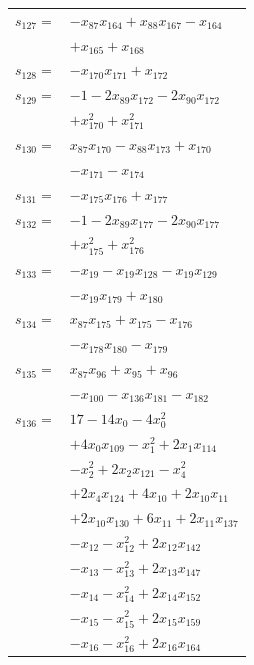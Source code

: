 \begin{longtable}{@{}r@{\;}l@{}}
\(s_{127}=\) & \(\displaystyle -x_{87}x_{164} +x_{88}x_{167} -x_{164}\) \\
 & \(\displaystyle +x_{165} +x_{168}\) \\[3pt]
\(s_{128}=\) & \(\displaystyle -x_{170}x_{171} +x_{172}\) \\[3pt]
\(s_{129}=\) & \(\displaystyle -1 -2x_{89}x_{172} -2x_{90}x_{172}\) \\
 & \(\displaystyle +x_{170}^{2} +x_{171}^{2}\) \\[3pt]
\(s_{130}=\) & \(\displaystyle x_{87}x_{170} -x_{88}x_{173} +x_{170}\) \\
 & \(\displaystyle -x_{171} -x_{174}\) \\[3pt]
\(s_{131}=\) & \(\displaystyle -x_{175}x_{176} +x_{177}\) \\[3pt]
\(s_{132}=\) & \(\displaystyle -1 -2x_{89}x_{177} -2x_{90}x_{177}\) \\
 & \(\displaystyle +x_{175}^{2} +x_{176}^{2}\) \\[3pt]
\(s_{133}=\) & \(\displaystyle -x_{19} -x_{19}x_{128} -x_{19}x_{129}\) \\
 & \(\displaystyle -x_{19}x_{179} +x_{180}\) \\[3pt]
\(s_{134}=\) & \(\displaystyle x_{87}x_{175} +x_{175} -x_{176}\) \\
 & \(\displaystyle -x_{178}x_{180} -x_{179}\) \\[3pt]
\(s_{135}=\) & \(\displaystyle x_{87}x_{96} +x_{95} +x_{96}\) \\
 & \(\displaystyle -x_{100} -x_{136}x_{181} -x_{182}\) \\[3pt]
\(s_{136}=\) & \(\displaystyle 17 -14x_{0} -4x_{0}^{2}\) \\
 & \(\displaystyle +4x_{0}x_{109} -x_{1}^{2} +2x_{1}x_{114}\) \\
 & \(\displaystyle -x_{2}^{2} +2x_{2}x_{121} -x_{4}^{2}\) \\
 & \(\displaystyle +2x_{4}x_{124} +4x_{10} +2x_{10}x_{11}\) \\
 & \(\displaystyle +2x_{10}x_{130} +6x_{11} +2x_{11}x_{137}\) \\
 & \(\displaystyle -x_{12} -x_{12}^{2} +2x_{12}x_{142}\) \\
 & \(\displaystyle -x_{13} -x_{13}^{2} +2x_{13}x_{147}\) \\
 & \(\displaystyle -x_{14} -x_{14}^{2} +2x_{14}x_{152}\) \\
 & \(\displaystyle -x_{15} -x_{15}^{2} +2x_{15}x_{159}\) \\
 & \(\displaystyle -x_{16} -x_{16}^{2} +2x_{16}x_{164}\) \\

\end{longtable}
